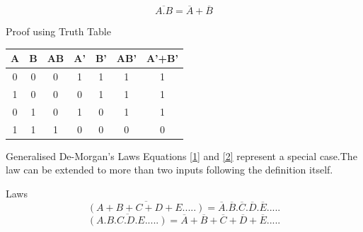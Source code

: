 \documentclass{beamer}
\begin{document}
\begin{frame}
\begin{equation}\label{2}
                     \overline{A.B} = \overline{A}+\overline{B}
\end{equation}
        \begin{block}{Proof using Truth Table}
                \begin{tabular}{|c|c||c||c||c||c||c|}
                        \hline
                         \textbf{A} &
                        \textbf{B} & \textbf{AB} & \textbf{A'} & \textbf{B'} &
                        \textbf{AB'} & \textbf{A'+B'}\\
                        \hline
                        \hline
                         0 & 0 & 0 & 1 & 1 & 1 & 1 \\
                        \hline
                         1 & 0 & 0 & 0 & 1 & 1 & 1 \\
                        \hline
                        0 & 1 & 0 & 1 & 0 & 1 & 1 \\
                        \hline
                         1 & 1 & 1 & 0 & 0 & 0 & 0 \\
                        \hline
                \end{tabular}
        \end{block}
    
\end{frame}
\begin{frame}{Generalised De-Morgan's Laws}
Equations \ref{1} and \ref{2} represent a special case.The law can be extended to more than two inputs following the definition itself.
\pause
\begin{block}{Laws}
\begin{equation}
\overline{(A+B+C+D+E.....)}=\overline{A}.\overline{B}.\overline{C}.\overline{D}.\overline{E}.....
\end{equation}
\begin{equation}
\overline{(A.B.C.D.E.....)}=\overline{A}+\overline{B}+\overline{C}+\overline{D}+\overline{E}.....
\end{equation}
\end{block}
\end{frame}
\end{document}
